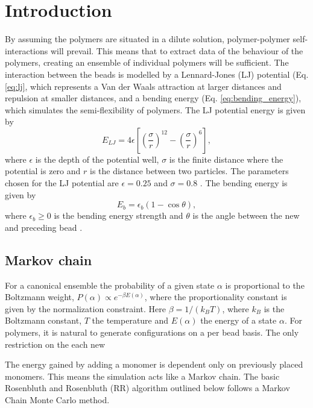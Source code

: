 \section{Introduction}


By assuming the polymers are situated in a dilute solution, polymer-polymer self-interactions will prevail. This means that to extract data of the behaviour of the polymers, creating an ensemble of individual polymers will be sufficient.
The interaction between the beads is modelled by a Lennard-Jones (LJ) potential (Eq. \ref{eq:lj}, which represents a Van der Waals attraction at larger distances and repulsion at smaller distances, and a bending energy (Eq. \ref{eq:bending_energy}), which simulates the semi-flexibility of polymers. The LJ potential energy is given by 
\begin{equation}\label{eq:lj}
   E_{LJ} = 4\epsilon \left[ \left(\frac{\sigma}{r}\right)^{12} - \left(\frac{\sigma}{r}\right)^{6} \right],
\end{equation} where $\epsilon$ is the depth of the potential well, $\sigma$ is the finite distance where the potential is zero and $r$ is the distance between two particles. The parameters chosen for the LJ potential are $\epsilon=0.25$ and $\sigma=0.8$ \cite{jmt}. The bending energy is given by
\begin{equation}\label{eq:bending_energy}
    E_{b} = \epsilon_b(1-\cos{\theta}),
\end{equation} where $\epsilon_b\geq 0$ is the bending energy strength and $\theta$ is the angle between the new and preceding bead \cite{hsu2011review}.

\subsection{Markov chain}
For a canonical ensemble the probability of a given state $\alpha$ is proportional to the Boltzmann weight, $P(\alpha) \propto e^{-\beta E(\alpha)}$, where the proportionality constant is given by the normalization constraint.  Here $\beta=1/\left(k_B T\right)$, where $k_B$ is the Boltzmann constant, $T$ the temperature and $E(\alpha)$ the energy of a state $\alpha$. For polymers, it is natural to generate configurations on a per bead basis. The only restriction on the each new 

The energy gained by adding a monomer is dependent only on previously placed monomers. This means the simulation acts like a Markov chain. The basic Rosenbluth and Rosenbluth (RR) algorithm outlined below follows a Markov Chain Monte Carlo method.




